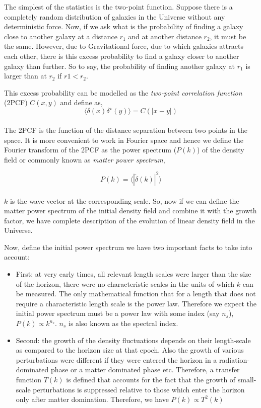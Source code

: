 The simplest of the statistics is the two-point function. Suppose there is a 
completely random distribution of galaxies in the Universe without any deterministic 
force. Now, if we ask what is the probability of finding a galaxy close to another
galaxy at a distance $r_1$ and at another distance $r_2$, it must be the same. 
However, due to Gravitational force, due to which galaxies attracts each other, 
there is this excess probability to find a galaxy closer to another galaxy than
further. So to say, the probability of finding another galaxy at $r_1$ is larger than
at $r_2$ if $r1<r_2$.

This excess probability can be modelled as the {\it two-point correlation function} (2PCF) 
$C(x,y)$ and define as, 
\begin{equation}
	\langle \delta(x) \delta^{\star}(y) \rangle = C(|x-y|)
\end{equation}
\\
The 2PCF is the function of the distance
separation between two points in the space. It is more convenient to work in 
Fourier space and hence we define the Fourier transform of the 2PCF as the 
power spectrum ($P(k)$) of the density field or commonly known as
{\it matter power spectrum},

\begin{equation}
		P(k)  =  \langle |\tilde{\delta}(k) |^2\rangle 
\end{equation}
\\
$k$ is the wave-vector at the corresponding scale. So, now if we can 
define the matter power spectrum of the initial density field and combine
it with the growth factor, we have complete description of the evolution 
of linear density field in the Universe. 

Now, define the initial power spectrum we have two important facts to 
take into account:
\begin{itemize}
  \item	First: at very early times, all relevant length scales
	were larger than the size of the horizon, there were no characteristic scales
	in the units of which $k$ can be measured. The only mathematical function
	that for a length that does not require a characteristic length scale is
	the power law. Therefore we expect the initial power spectrum must be a power
	law with some index (say $n_s$), $P(k)\propto k^{n_s}$. $n_s$ is also known
	as the spectral index.
  \item Second: the growth of the density fluctuations depends on their length-scale
  	as compared to the horizon size at that epoch. Also the growth of various
  	perturbations were different if they were entered the horizon in a radiation-
  	dominated phase or a matter dominated phase etc. Therefore, a transfer function $T(k)$
  	is defined that accounts for the fact that the growth of small-scale perturbations
  	is suppressed relative to those which enter the horizon only after matter domination.
  	Therefore, we have $P(k) \propto T^2(k)$ 
\end{itemize}

